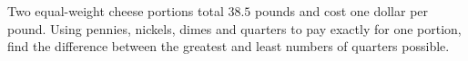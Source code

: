 Two equal-weight cheese portions total $38.5$ pounds and cost one dollar per pound. Using pennies, nickels, dimes and quarters to pay exactly for one portion, find the difference between the greatest and least numbers of quarters possible.
